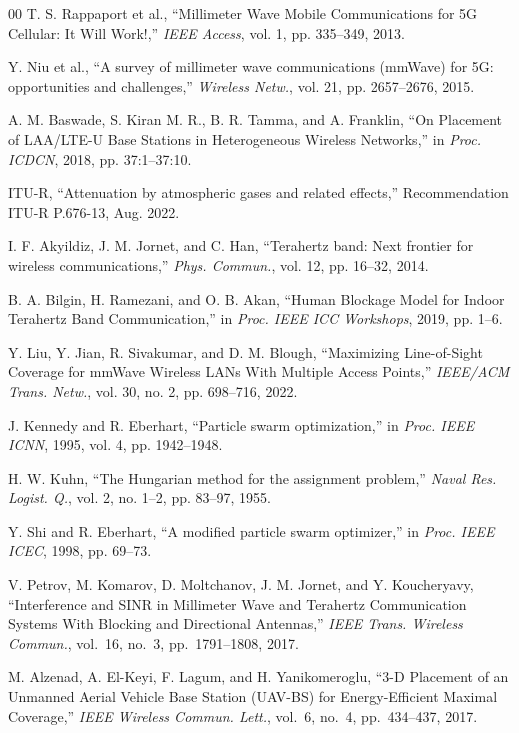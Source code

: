 \documentclass[conference]{IEEEtran}
\begin{document}
	\begin{thebibliography}{00}
		 T. S. Rappaport et al., ``Millimeter Wave Mobile Communications for 5G Cellular: It Will Work!,'' \textit{IEEE Access}, vol. 1, pp. 335--349, 2013.

		 Y. Niu et al., ``A survey of millimeter wave communications (mmWave) for 5G: opportunities and challenges,'' \textit{Wireless Netw.}, vol. 21, pp. 2657--2676, 2015.

	A. M. Baswade, S. Kiran M. R., B. R. Tamma, and A. Franklin,
	``On Placement of LAA/LTE-U Base Stations in Heterogeneous Wireless Networks,'' in \textit{Proc. ICDCN}, 2018, pp. 37:1--37:10.

		 ITU-R, ``Attenuation by atmospheric gases and related effects,'' Recommendation ITU-R P.676-13, Aug. 2022.

		 I. F. Akyildiz, J. M. Jornet, and C. Han, ``Terahertz band: Next frontier for wireless communications,'' \textit{Phys. Commun.}, vol. 12, pp. 16--32, 2014.

		B. A. Bilgin, H. Ramezani, and O. B. Akan,
		``Human Blockage Model for Indoor Terahertz Band Communication,''
		in \textit{Proc. IEEE ICC Workshops},
		2019, pp. 1--6.

		Y. Liu, Y. Jian, R. Sivakumar, and D. M. Blough,
		``Maximizing Line-of-Sight Coverage for mmWave Wireless LANs With
		Multiple Access Points,'' \textit{IEEE/ACM Trans. Netw.}, vol. 30,
		no. 2, pp. 698--716, 2022.

		 J. Kennedy and R. Eberhart, ``Particle swarm optimization,'' in \textit{Proc. IEEE ICNN}, 1995, vol. 4, pp. 1942--1948.

		 H. W. Kuhn, ``The Hungarian method for the assignment problem,'' \textit{Naval Res. Logist. Q.}, vol. 2, no. 1--2, pp. 83--97, 1955.

		 Y. Shi and R. Eberhart, ``A modified particle swarm optimizer,'' in \textit{Proc. IEEE ICEC}, 1998, pp. 69--73.

		V. Petrov, M. Komarov, D. Moltchanov, J. M. Jornet, and
		Y. Koucheryavy, ``Interference and SINR in Millimeter Wave and
		Terahertz Communication Systems With Blocking and Directional
		Antennas,'' \textit{IEEE Trans. Wireless Commun.}, vol.~16, no.~3,
		pp.~1791--1808, 2017.

		M. Alzenad, A. El-Keyi, F. Lagum, and H. Yanikomeroglu,
		``3-D Placement of an Unmanned Aerial Vehicle Base Station (UAV-BS)
		for Energy-Efficient Maximal Coverage,'' \textit{IEEE Wireless
			Commun. Lett.}, vol.~6, no.~4, pp.~434--437, 2017.


\end{thebibliography}
\end{document}
